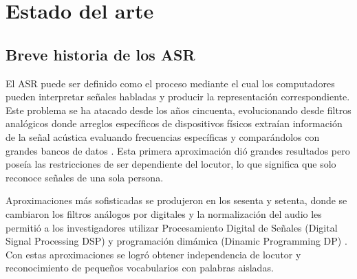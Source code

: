 \chapter{Estado del arte}

\section{Breve historia de los ASR}

El ASR puede ser definido como el proceso mediante el cual los computadores pueden interpretar señales habladas y producir la representación correspondiente. Este problema se ha atacado desde los años cincuenta, evolucionando desde filtros analógicos donde arreglos específicos de dispositivos físicos extraían información de la señal acústica evaluando frecuencias específicas y comparándolos con grandes bancos de datos \cite{Davis1952AutomaticDigits,Olson1957PhoneticTypewriter}. Esta primera aproximación dió grandes resultados pero poseía las restricciones de ser dependiente del locutor, lo que significa que solo reconoce señales de una sola persona.

Aproximaciones más sofisticadas se produjeron en los sesenta y setenta, donde se cambiaron los filtros análogos por digitales y la normalización del audio les permitió a los investigadores utilizar Procesamiento Digital de Señales (Digital Signal Processing DSP) y programación dimámica (Dinamic Programming DP) \cite{Velichko1970AutomaticWords,Sakoe1978DynamicRecognition,Itakura1975MinimumRecognition}. Con estas aproximaciones se logró obtener independencia de locutor y reconocimiento de pequeños vocabularios con palabras aisladas.

